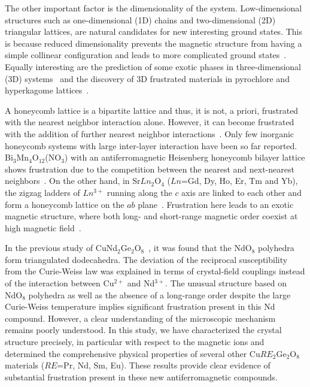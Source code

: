 \documentclass[aps,prl,reprint,amsmath,amssymb,superscriptaddress,showpacs]{revtex4-1}
\begin{document}
The other important factor is the dimensionality of the system. Low-dimensional structures such as one-dimensional (1D) chains and two-dimensional (2D) triangular lattices, are natural candidates for new interesting ground states. This is because reduced dimensionality prevents the magnetic structure from having a simple collinear configuration and leads to more complicated ground states~\cite{N.Mermin1966,P.Anderson1973}. Equally interesting are the prediction of some exotic phases in three-dimensional (3D) systems~\cite{M.Hermele2004,A.Banerjee2008,O.Sikora2009} and the discovery of 3D frustrated materials in pyrochlore and hyperkagome lattices~\cite{Y.Okamoto2007,M.Lawler2008,P.Khuntia2016}.

A honeycomb lattice is a bipartite lattice and thus, it is not, a priori, frustrated with the nearest neighbor interaction alone. However, it can become frustrated with the addition of further nearest neighbor interactions~\cite{R.Bishop2015,J.Rehn2016}. Only few inorganic honeycomb systems with large inter-layer interaction have been so far reported. Bi$_3$Mn$_4$O$_{12}$(NO$_3$) with an antiferromagnetic Heisenberg honeycomb bilayer lattice shows frustration due to the competition between the nearest and next-nearest neighbors~\cite{O.Smirnova2009,H.Kandpal2011}. On the other hand, in Sr$Ln_2$O$_4$ ($Ln$=Gd, Dy, Ho, Er, Tm and Yb), the zigzag ladders of $Ln^{3+}$ running along the $c$ axis are linked to each other and form a honeycomb lattice on the $ab$ plane~\cite{H.Karunadasa2005}. Frustration here leads to an exotic magnetic structure, where both long- and short-range magnetic order coexist at high magnetic field~\cite{T.Hayes2011,D.Quintero-Castro2012}.

In the previous study of CuNd$_2$Ge$_2$O$_8$~\cite{J.Campa1995}, it was found that the NdO$_8$ polyhedra form triangulated dodecahedra. The deviation of the reciprocal susceptibility from the Curie-Weiss law was explained in terms of crystal-field couplings instead of the interaction between Cu$^{2+}$ and Nd$^{3+}$. The unusual structure based on NdO$_8$ polyhedra as well as the absence of a long-range order despite the large Curie-Weiss temperature implies significant frustration present in this Nd compound. However, a clear understanding of the microscopic mechanism remains poorly understood. In this study, we have characterized the crystal structure precisely, in particular with respect to the magnetic ions and determined the comprehensive physical properties of several other Cu$RE_2$Ge$_2$O$_8$ materials ($RE$=Pr, Nd, Sm, Eu). These results provide clear evidence of substantial frustration present in these new antiferromagnetic compounds.
\end{document}
